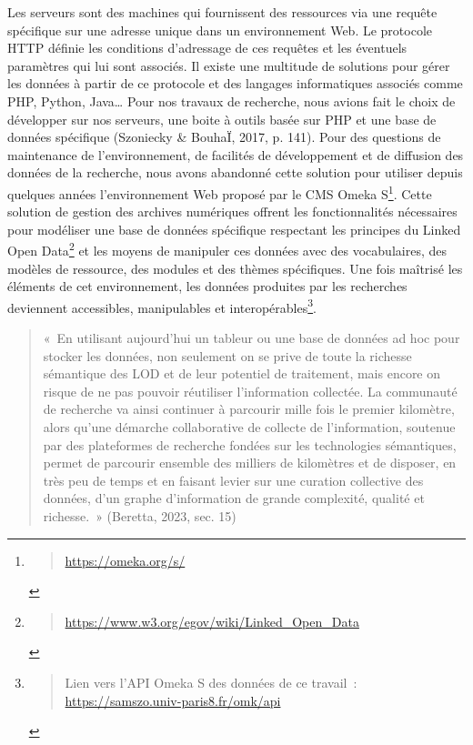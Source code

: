\documentclass[
  a4paper,
  DIV=11,
  numbers=noendperiod]{scrreprt}
\begin{document}
Les serveurs sont des machines qui fournissent des ressources via une
requête spécifique sur une adresse unique dans un environnement Web. Le
protocole HTTP définie les conditions d'adressage de ces requêtes et les
éventuels paramètres qui lui sont associés. Il existe une multitude de
solutions pour gérer les données à partir de ce protocole et des
langages informatiques associés comme PHP, Python, Java\ldots{} Pour nos
travaux de recherche, nous avions fait le choix de développer sur nos
serveurs, une boite à outils basée sur PHP et une base de données
spécifique (Szoniecky \& BouhaÏ, 2017, p. 141). Pour des questions de
maintenance de l'environnement, de facilités de développement et de
diffusion des données de la recherche, nous avons abandonné cette
solution pour utiliser depuis quelques années l'environnement Web
proposé par le CMS Omeka S\footnote{\begin{quote}
  \url{https://omeka.org/s/}
  \end{quote}}. Cette solution de gestion des archives numériques
offrent les fonctionnalités nécessaires pour modéliser une base de
données spécifique respectant les principes du Linked Open
Data\footnote{\begin{quote}
  \url{https://www.w3.org/egov/wiki/Linked_Open_Data}
  \end{quote}} et les moyens de manipuler ces données avec des
vocabulaires, des modèles de ressource, des modules et des thèmes
spécifiques. Une fois maîtrisé les éléments de cet environnement, les
données produites par les recherches deviennent accessibles,
manipulables et interopérables\footnote{\begin{quote}
  Lien vers l'API Omeka S des données de ce travail~:
  \url{https://samszo.univ-paris8.fr/omk/api}
  \end{quote}}.

\begin{quote}
«~En utilisant aujourd'hui un tableur ou une base de données ad hoc pour
stocker les données, non seulement on se prive de toute la richesse
sémantique des LOD et de leur potentiel de traitement, mais encore on
risque de ne pas pouvoir réutiliser l'information collectée. La
communauté de recherche va ainsi continuer à parcourir mille fois le
premier kilomètre, alors qu'une démarche collaborative de collecte de
l'information, soutenue par des plateformes de recherche fondées sur les
technologies sémantiques, permet de parcourir ensemble des milliers de
kilomètres et de disposer, en très peu de temps et en faisant levier sur
une curation collective des données, d'un graphe d'information de grande
complexité, qualité et richesse.~» (Beretta, 2023, sec. 15)
\end{quote}
\end{document}
